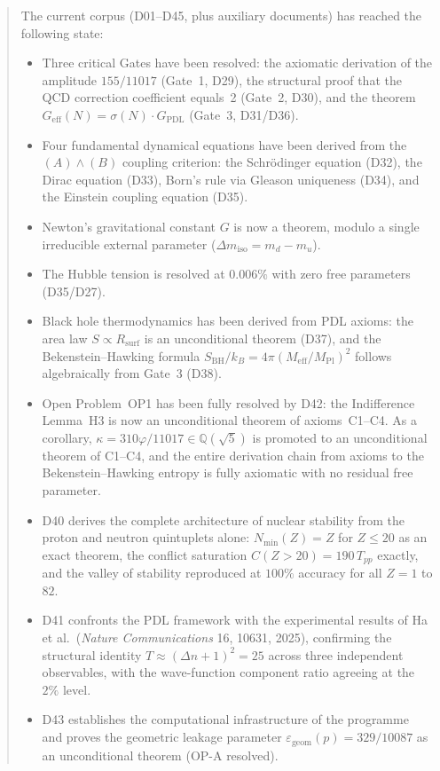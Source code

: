 \documentclass[11pt,a4paper]{article}
\theoremstyle{plain}
\theoremstyle{definition}
\theoremstyle{remark}
\newcommand{\Geff}{G_{\mathrm{eff}}}
\newcommand{\GPDL}{G_{\mathrm{PDL}}}
\newcommand{\Rsurf}{R_{\mathrm{surf}}}
\newcommand{\sigmaN}{\sigma(N)}
\newcommand{\SBH}{S_{\mathrm{BH}}}
\newcommand{\Meff}{M_{\mathrm{eff}}}
\newcommand{\MPl}{M_{\mathrm{Pl}}}
\newcommand{\Tpp}{T_{pp}}
\newcommand{\Nmin}{N_{\min}}
\begin{document}
\begin{abstract}
The current corpus (D01--D45, plus auxiliary documents) has reached the following state:
\begin{itemize}
\item Three critical Gates have been resolved: the axiomatic derivation of the amplitude $155/11017$ (Gate~1, D29), the structural proof that the QCD correction coefficient equals~2 (Gate~2, D30), and the theorem $\Geff(N)=\sigmaN\cdot\GPDL$ (Gate~3, D31/D36).
\item Four fundamental dynamical equations have been derived from the $(A)\wedge(B)$ coupling criterion: the Schr\"odinger equation (D32), the Dirac equation (D33), Born's rule via Gleason uniqueness (D34), and the Einstein coupling equation (D35).
\item Newton's gravitational constant $G$ is now a theorem, modulo a single irreducible external parameter ($\Delta m_{\mathrm{iso}} = m_d - m_u$).
\item The Hubble tension is resolved at $0.006\%$ with zero free parameters (D35/D27).
\item Black hole thermodynamics has been derived from PDL axioms: the area law $S \propto \Rsurf$ is an unconditional theorem (D37), and the Bekenstein--Hawking formula $\SBH/k_B = 4\pi(\Meff/\MPl)^2$ follows algebraically from Gate~3 (D38).
\item Open Problem~OP1 has been fully resolved by D42: the Indifference Lemma~H3 is now an unconditional theorem of axioms~C1--C4. As a corollary, $\kappa = 310\varphi/11017 \in \mathbb{Q}(\sqrt{5})$ is promoted to an unconditional theorem of C1--C4, and the entire derivation chain from axioms to the Bekenstein--Hawking entropy is fully axiomatic with no residual free parameter.
\item D40 derives the complete architecture of nuclear stability from the proton and neutron quintuplets alone: $\Nmin(Z) = Z$ for $Z \leq 20$ as an exact theorem, the conflict saturation $C(Z>20) = 190\,\Tpp$ exactly, and the valley of stability reproduced at $100\%$ accuracy for all $Z=1$ to $82$.
\item D41 confronts the PDL framework with the experimental results of Ha et al.\ (\textit{Nature Communications} 16, 10631, 2025), confirming the structural identity $T \approx (\Delta n+1)^2 = 25$ across three independent observables, with the wave-function component ratio agreeing at the $2\%$ level.
\item D43 establishes the computational infrastructure of the programme and proves the geometric leakage parameter $\varepsilon_{\mathrm{geom}}(p) = 329/10087$ as an unconditional theorem (OP-A resolved).

\end{itemize}
\end{abstract}
\end{document}
